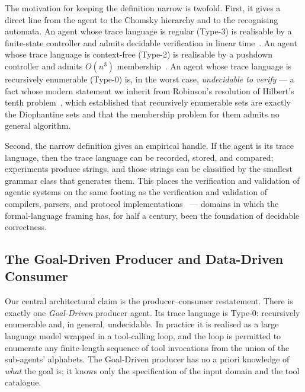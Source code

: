 The motivation for keeping the definition narrow is twofold.
First, it gives a direct line from the agent to the Chomsky
hierarchy and to the recognising automata.  An agent whose trace
language is regular (Type-3) is realisable by a finite-state
controller and admits decidable verification in linear
time~\cite{rabin1959finite}.  An agent whose trace language is
context-free (Type-2) is realisable by a pushdown controller and
admits $O(n^3)$ membership~\cite{hopcroft2006automata}.  An agent
whose trace language is recursively enumerable (Type-0) is, in
the worst case, \emph{undecidable to verify} --- a fact whose
modern statement we inherit from Robinson's resolution of
Hilbert's tenth
problem~\cite{robinson1949definability,davis1961decision}, which
established that recursively enumerable sets are exactly the
Diophantine sets and that the membership problem for them admits
no general algorithm.

Second, the narrow definition gives an empirical handle.  If the
agent is its trace language, then the trace language can be
recorded, stored, and compared; experiments produce strings, and
those strings can be classified by the smallest grammar class
that generates them.  This places the verification and validation of agentic systems on
the same footing as the verification and validation of compilers, parsers, and protocol
implementations~\cite{aho1972theory,hoare1969axiomatic} ---
domains in which the formal-language framing has, for half a
century, been the foundation of decidable correctness.

\subsection{The Goal-Driven Producer and Data-Driven Consumer}

Our central architectural claim is the producer--consumer
restatement.  There is exactly one \emph{Goal-Driven} producer
agent.  Its trace language is Type-0: recursively enumerable
and, in general, undecidable.  In practice it is realised as a
large language model wrapped in a tool-calling loop, and the
loop is permitted to enumerate any finite-length sequence of
tool invocations from the union of the sub-agents' alphabets.
The Goal-Driven producer has no a priori knowledge of \emph{what}
the goal is; it knows only the specification of the input domain
and the tool catalogue.

